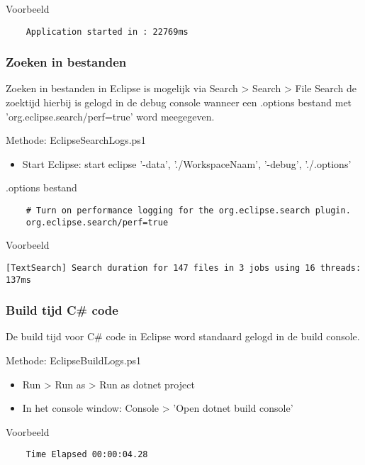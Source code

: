Voorbeeld
\vspace{\verbatimOffset}
\begin{verbatim}
    Application started in : 22769ms    
\end{verbatim}

\subsubsection{Zoeken in bestanden}
Zoeken in bestanden in Eclipse is mogelijk via Search > Search > File Search de zoektijd hierbij is gelogd in de debug console wanneer een .options bestand met 'org.eclipse.search/perf=true' word meegegeven.

Methode: EclipseSearchLogs.ps1
\begin{itemize}
	\item Start Eclipse: start eclipse '-data', './WorkspaceNaam',  '-debug', './.options'
\end{itemize}

.options bestand
\vspace{\verbatimOffset}
\begin{verbatim}
    # Turn on performance logging for the org.eclipse.search plugin.
    org.eclipse.search/perf=true
\end{verbatim}

Voorbeeld
\vspace{\verbatimOffset}
\begin{verbatim}
[TextSearch] Search duration for 147 files in 3 jobs using 16 threads: 137ms    
\end{verbatim}

\subsubsection{Build tijd C\# code}
De build tijd voor C\# code in Eclipse word standaard gelogd in de build console.

Methode: EclipseBuildLogs.ps1
\begin{itemize}
	\item Run > Run as > Run as dotnet project
	\item In het console window: Console > 'Open dotnet build console'
\end{itemize}

Voorbeeld
\vspace{\verbatimOffset}
\begin{verbatim}
    Time Elapsed 00:00:04.28   
\end{verbatim}

